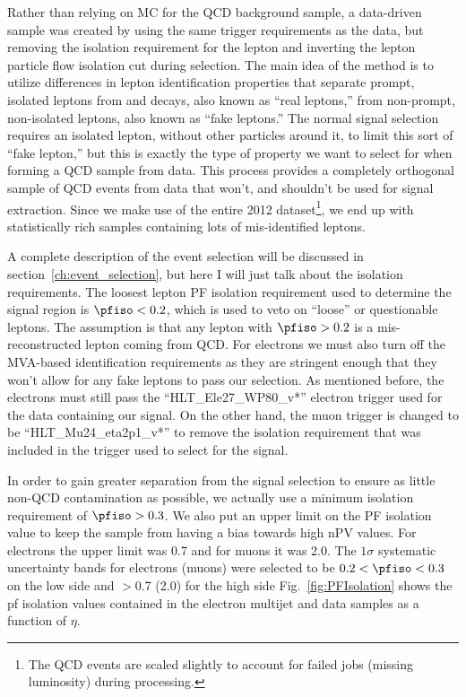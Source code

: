 Rather than relying on MC for the QCD background sample, a data-driven sample was created by using the same trigger requirements as the data, but removing the isolation requirement for the lepton and inverting the lepton particle flow isolation cut during selection.
The main idea of the method is to utilize differences in lepton identification properties that separate prompt, isolated leptons from \W and \Z decays, also known as ``real leptons,'' from non-prompt, non-isolated leptons, also known as ``fake leptons.''
The normal signal selection requires an isolated lepton, without other particles around it, to limit this sort of ``fake lepton,'' but this is exactly the type of property we want to select for when forming a QCD sample from data.
This process provides a completely orthogonal sample of QCD events from data that won't, and shouldn't be used for signal extraction.
Since we make use of the entire 2012 dataset\footnote{The QCD events are scaled slightly to account for failed jobs (missing luminosity) during processing.}, we end up with statistically rich samples containing lots of mis-identified leptons.

A complete description of the event selection will be discussed in section~\ref{ch:event_selection}, but here I will just talk about the isolation requirements.
The loosest lepton PF isolation requirement used to determine the signal region is $\pfiso<0.2$, which is used to veto on ``loose'' or questionable leptons.
The assumption is that any lepton with $\pfiso>0.2$ is a mis-reconstructed lepton coming from QCD.
For electrons we must also turn off the MVA-based identification requirements as they are stringent enough that they won't allow for any fake leptons to pass our selection.
As mentioned before, the electrons must still pass the ``HLT\_Ele27\_WP80\_v*'' electron trigger used for the data containing our signal.
On the other hand, the muon trigger is changed to be ``HLT\_Mu24\_eta2p1\_v*'' to remove the isolation requirement that was included in the trigger used to select for the signal.

In order to gain greater separation from the signal selection to ensure as little non-QCD contamination as possible, we actually use a minimum isolation requirement of $\pfiso>0.3$.
We also put an upper limit on the PF isolation value to keep the sample from having a bias towards high nPV values.
For electrons the upper limit was 0.7 and for muons it was 2.0.
The $1\sigma$ systematic uncertainty bands for electrons (muons) were selected to be $0.2<\pfiso<0.3$ on the low side and $>$0.7 (2.0) for the high side
Fig.~\ref{fig:PFIsolation} shows the pf isolation values contained in the electron multijet and data samples as a function of $\eta$.

